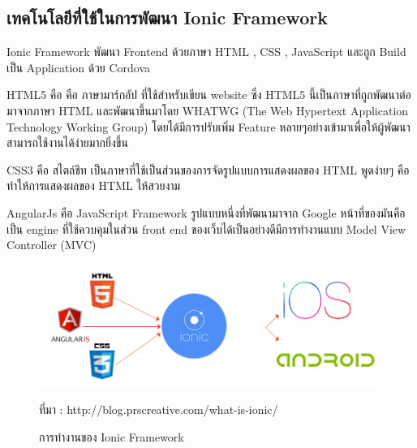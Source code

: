 		\subsection{เทคโนโลยีที่ใช้ในการพัฒนา Ionic Framework}
		Ionic Framework พัฒนา Frontend ด้วยภาษา HTML , CSS , JavaScript และถูก Build เป็น Application ด้วย Cordova
		\item HTML5  คือ คือ ภาษามาร์กอัป ที่ใช้สำหรับเขียน website ซึ่ง HTML5 นี้เป็นภาษาที่ถูกพัฒนาต่อมาจากภาษา HTML และพัฒนาขึ้นมาโดย WHATWG (The Web Hypertext Application Technology Working Group) โดยได้มีการปรับเพิ่ม Feature หลายๆอย่างเข้ามาเพื่อให้ผู้พัฒนาสามารถใช้งานได้ง่ายมากยิ่งขึ้น
		\item CSS3  คือ สไตล์ชีท เป็นภาษาที่ใช้เป็นส่วนของการจัดรูปแบบการแสดงผลของ HTML พูดง่ายๆ คือทำให้การแสดงผลของ HTML ให้สวยงาม
		\item AngularJs คือ JavaScript Framework  รูปแบบหนึ่งที่พัฒนามาจาก Google หน้าที่ของมันคือเป็น engine ที่ใช้ควบคุมในส่วน front end ของเว็บได้เป็นอย่างดีมีการทำงานแบบ Model View Controller (MVC)
		
		\begin{figure}[H]
			\centering
			\includegraphics[width=0.8\columnwidth]{Figures/2/ionic1}
			\caption{การทำงานของ Ionic Framework}{ที่มา : http://blog.prscreative.com/what-is-ionic/}
			\label{Fig:lifecycle}
		\end{figure}

